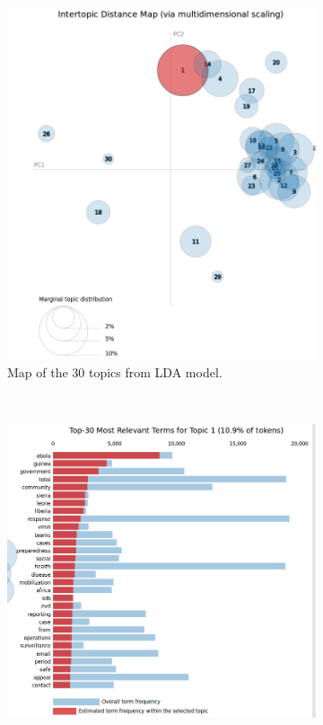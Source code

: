 \newpage
\begin{figure}[h!]
    \centering
    \begin{subfigure}[h]{0.60\textwidth}
        \includegraphics[width=\textwidth]{c4_7.png}
        \caption{Map of the 30 topics from LDA model.}
        \label{fig:trapez1}
    \end{subfigure}
    ~ %
    \begin{subfigure}[h]{0.60\textwidth}
        \includegraphics[width=\textwidth]{c4_8.png}

\end{subfigure}
\end{figure}
